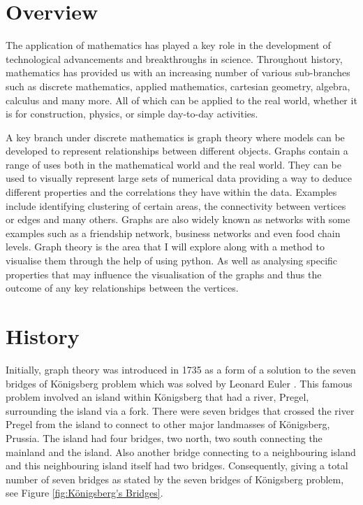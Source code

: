 \section{Overview}
The application of mathematics has played a key role in the development of technological advancements and breakthroughs in science. Throughout history, mathematics has provided us with an increasing number of various sub-branches such as discrete mathematics, applied mathematics, cartesian geometry, algebra, calculus and many more. All of which can be applied to the real world, whether it is for construction, physics, or simple day-to-day activities. 

A key branch under discrete mathematics is graph theory where models can be developed to represent relationships between different objects. Graphs contain a range of uses both in the mathematical world and the real world. They can be used to visually represent large sets of numerical data providing a way to deduce different properties and the correlations they have within the data. Examples include identifying clustering of certain areas, the connectivity between vertices or edges and many others. Graphs are also widely known as networks with some examples such as a friendship network, business networks and even food chain levels. Graph theory is the area that I will explore along with a method to visualise them through the help of using python. As well as analysing specific properties that may influence the visualisation of the graphs and thus the outcome of any key relationships between the vertices.

\section{History}
Initially, graph theory was introduced in 1735 as a form of a solution to the seven bridges of Königsberg problem which was solved by Leonard Euler \cite{POWELL20151}. This famous problem involved an island within Königsberg that had a river, Pregel, surrounding the island via a fork. There were seven bridges that crossed the river Pregel from the island to connect to other major landmasses of Königsberg, Prussia. The island had four bridges, two north, two south connecting the mainland and the island. Also another bridge connecting to a neighbouring island and this neighbouring island itself had two bridges. Consequently, giving a total number of seven bridges as stated by the seven bridges of Königsberg problem, see Figure \ref{fig:Königsberg's Bridges}. 

